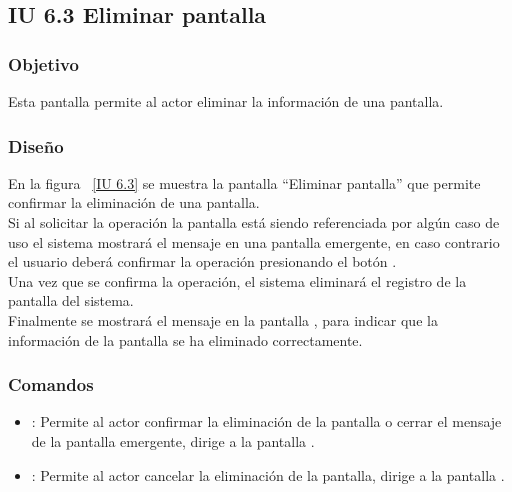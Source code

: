 \subsection{IU 6.3 Eliminar pantalla}

\subsubsection{Objetivo}
	
	Esta pantalla permite al actor eliminar la información de una pantalla.

\subsubsection{Diseño}

    En la figura ~\ref{IU 6.3} se muestra la pantalla ``Eliminar pantalla'' que permite confirmar la eliminación de una pantalla. \\
    
    Si al solicitar la operación la pantalla está siendo referenciada por algún caso de uso el sistema mostrará el mensaje  en una pantalla emergente, en caso contrario el usuario 
    deberá confirmar la operación presionando el botón .\\
    
    Una vez que se confirma la operación, el sistema eliminará el registro de la pantalla del sistema.  \\
    
    Finalmente se mostrará el mensaje  en la pantalla , 
    para indicar que la información de la pantalla
    se ha eliminado correctamente.        



\subsubsection{Comandos}
\begin{itemize}
	\item {}: Permite al actor confirmar la eliminación de la pantalla o cerrar el mensaje  de la pantalla emergente, dirige a la pantalla .
	\item {}: Permite al actor cancelar la eliminación de la pantalla, dirige a la pantalla .
\end{itemize}

